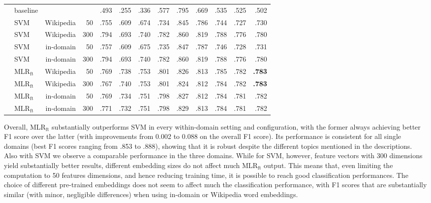 \documentclass[epsfig,a4paper,12pt,titlepage]{book}
\newcommand{\mlr}{MLR$_\text{ft}$\xspace}
\begin{document}
\begin{table}[H]
\begin{center}
\begin{adjustbox}{width=\textwidth}
\begin{tabular}{|llr@{\hskip 0.3in}rrrr|rrr|rrr|}
                & baseline &    &  & .493  & .255  & .336  & .577  & .795  & .669  & .535 & .525 & .502                          \\
                 & SVM  & Wikipedia    & 50   & .755  & .609  & .674  & .734  & .845  & .786  & .744 & .727 & .730                          \\
                 & SVM  & Wikipedia    & 300  & .794  & .693  & .740  & .782  & .860  & .819  & .788 & .776 & .780                           \\
                & SVM      & in-domain  & 50   & .757  & .609  & .675  & .735  & .847  & .787  & .746 & .728 & .731                          \\
                & SVM      & in-domain  & 300  & .794  & .693  & .740  & .782  & .860  & .819  & .788 & .776 & .780                            \\
                & \mlr & Wikipedia    & 50   & .769  & .738  & .753  & .801  & .826  & .813  & .785 & .782 & \textbf{.783}                 \\
                & \mlr & Wikipedia    & 300  & .767  & .740  & .753  & .801  & .824  & .812  & .784 & .782 & \textbf{.783}                         \\
                    & \mlr & in-domain & 50   & .769  & .734  & .751  & .798  & .827  & .812  & .784 & .781 & .782                 \\
                 & \mlr & in-domain  & 300  &   .771  & .732  & .751  & .798  & .829  & .813  & .784 & .781 & .782                         \\ 
                 \hline
\end{tabular}%
\end{adjustbox}
\end{center}
\end{table}
Overall, \mlr substantially outperforms SVM in every within-domain setting and configuration, with the former always achieving better F1 score over the latter (with improvements from 0.002 to 0.088 on the overall F1 score). Its performance is consistent for all single domains (best F1 scores ranging from .853 to .888), showing that it is robust despite the different topics mentioned in the descriptions. Also with SVM we observe a comparable performance in the three domains. While for SVM, however, feature vectors with 300 dimensions yield substantially better results, different embedding sizes do not affect much \mlr output. This means that, even limiting the computation to 50 features dimensions, and hence reducing training time, it is possible to reach good classification performances. The choice of different pre-trained embeddings does not seem to affect much the classification performance, with F1 scores that are substantially similar (with minor, negligible differences) when using in-domain or Wikipedia word embeddings.
\end{document}
